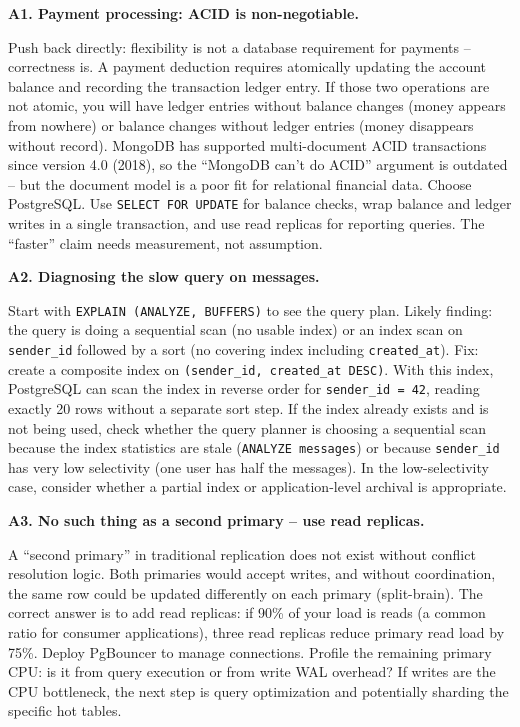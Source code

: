 \documentclass[11pt,a4paper]{article}
\begin{document}
\begin{answerbox}
\textbf{A1. Payment processing: ACID is non-negotiable.}

Push back directly: flexibility is not a database requirement for payments -- correctness is. A payment deduction requires atomically updating the account balance and recording the transaction ledger entry. If those two operations are not atomic, you will have ledger entries without balance changes (money appears from nowhere) or balance changes without ledger entries (money disappears without record). MongoDB has supported multi-document ACID transactions since version 4.0 (2018), so the ``MongoDB can't do ACID'' argument is outdated -- but the document model is a poor fit for relational financial data. Choose PostgreSQL. Use \texttt{SELECT FOR UPDATE} for balance checks, wrap balance and ledger writes in a single transaction, and use read replicas for reporting queries. The ``faster'' claim needs measurement, not assumption.

\vspace{8pt}
\textbf{A2. Diagnosing the slow query on messages.}

Start with \texttt{EXPLAIN (ANALYZE, BUFFERS)} to see the query plan. Likely finding: the query is doing a sequential scan (no usable index) or an index scan on \texttt{sender\_id} followed by a sort (no covering index including \texttt{created\_at}). Fix: create a composite index on \texttt{(sender\_id, created\_at DESC)}. With this index, PostgreSQL can scan the index in reverse order for \texttt{sender\_id = 42}, reading exactly 20 rows without a separate sort step. If the index already exists and is not being used, check whether the query planner is choosing a sequential scan because the index statistics are stale (\texttt{ANALYZE messages}) or because \texttt{sender\_id} has very low selectivity (one user has half the messages). In the low-selectivity case, consider whether a partial index or application-level archival is appropriate.

\vspace{8pt}
\textbf{A3. No such thing as a second primary -- use read replicas.}

A ``second primary'' in traditional replication does not exist without conflict resolution logic. Both primaries would accept writes, and without coordination, the same row could be updated differently on each primary (split-brain). The correct answer is to add read replicas: if 90\% of your load is reads (a common ratio for consumer applications), three read replicas reduce primary read load by 75\%. Deploy PgBouncer to manage connections. Profile the remaining primary CPU: is it from query execution or from write WAL overhead? If writes are the CPU bottleneck, the next step is query optimization and potentially sharding the specific hot tables.


\end{answerbox}
\end{document}
